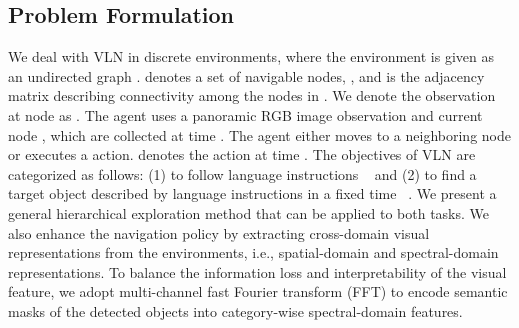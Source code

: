 \documentclass[10pt,twocolumn,letterpaper]{article}
\begin{document}
\subsection{Problem Formulation}
\vspace{-0.1cm}
\font=2.2pt
We deal with VLN in discrete environments, where the environment is given as an undirected graph .  denotes a set of  navigable nodes, , and  is the adjacency matrix describing connectivity among the nodes in . We denote the observation at node  as . The agent uses a panoramic RGB image observation  and current node , which are collected at time . The agent either moves to a neighboring node or executes a  action.  denotes the action at time . The objectives of VLN are categorized as follows: (1) to follow language instructions ~\cite{anderson2018vision} and (2) to find a target object described by language instructions in a fixed time  ~\cite{zhu2021soon, qi2020reverie}. We present a general hierarchical exploration method that can be applied to both tasks. We also enhance the navigation policy by extracting cross-domain visual representations from the environments, i.e., spatial-domain and spectral-domain representations. To balance the information loss and interpretability of the visual feature, we adopt multi-channel fast Fourier transform (FFT) to encode semantic masks of the detected objects into category-wise spectral-domain features.
\font=2.5pt
\vspace{-0.1cm}
\end{document}
